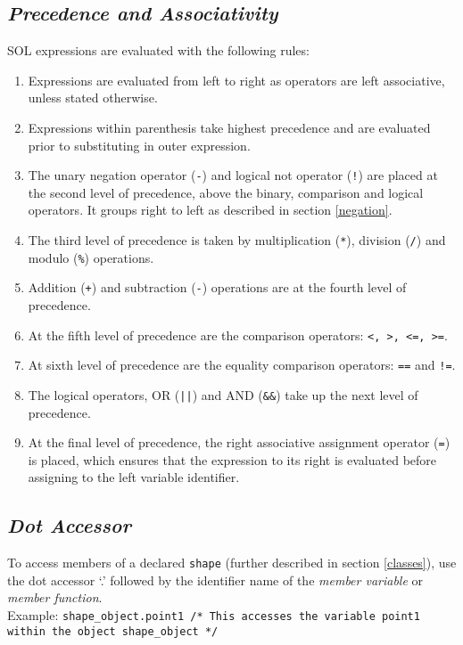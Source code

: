     \subsection{\textit{Precedence and Associativity}} \label{precedence}
    SOL expressions are evaluated with the following rules:
    \begin{enumerate}
        \itemsep0em
        \item Expressions are evaluated from left to right as operators are left associative, unless stated otherwise.

        \item Expressions within parenthesis take highest precedence and are evaluated prior to substituting in outer expression.
        
        \item The unary negation operator (\texttt{-}) and logical not operator (\texttt{!}) are placed at the second level of precedence, above the binary, comparison and logical operators. It groups right to left as described in section \ref{negation}.
        
        \item The third level of precedence is taken by multiplication (\texttt{*}), division (\texttt{/}) and modulo (\texttt{\%}) operations.
        
        \item Addition (\texttt{+}) and subtraction (\texttt{-}) operations are at the fourth level of precedence.
        
        \item At the fifth level of precedence are the comparison operators: \texttt{\textless, \textgreater, \textless=, \textgreater=}.

        \item At sixth level of precedence are the equality comparison operators: \texttt{==} and \texttt{!=}.

        \item The logical operators, OR (\texttt{||}) and AND (\texttt{\&\&}) take up the next level of precedence.

        \item At the final level of precedence, the right associative assignment operator (\texttt{=}) is placed, which ensures that the expression to its right is evaluated before assigning to the left variable identifier.

    \end{enumerate}
    
    \subsection{\textit{Dot Accessor}}
    To access members of a declared \texttt{shape} (further described in section \ref{classes}), use the dot accessor `.' followed by the identifier name of the \textit{member variable} or \textit{member function}. \\
    Example: \texttt{shape\_object.point1 /* This accesses the variable point1 within the object shape\_object */}


